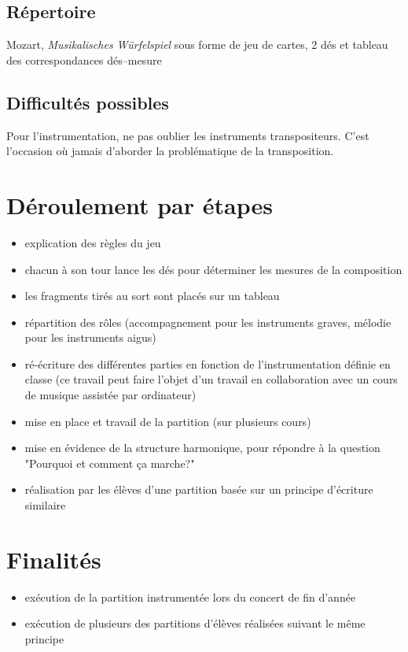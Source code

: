 \documentclass[a4paper,11pt,bibliography=totoc,numbers=noenddot,listof=flat,DIV=11,BCOR=0mm]{scrreprt}%
\begin{document}
\subsection*{Répertoire}
Mozart, \emph{Musikalisches Würfelspiel} sous forme de jeu de cartes, 2 dés et tableau des correspondances dés--mesure

\subsection*{Difficultés possibles}
Pour l'instrumentation, ne pas oublier les instruments transpositeurs. C'est l'occasion où jamais d'aborder la problématique de la transposition.

\section*{Déroulement par étapes}
\begin{itemize}
\item explication des règles du jeu
\item chacun à son tour lance les dés pour déterminer les mesures de la composition
\item les fragments tirés au sort sont placés sur un tableau 
\item répartition des rôles (accompagnement pour les instruments graves, mélodie pour les instruments aigus)
\item ré-écriture des différentes parties en fonction de l'instrumentation définie en classe (ce travail peut faire l'objet d'un travail en collaboration avec un cours de musique assistée par ordinateur)
\item mise en place et travail de la partition (sur plusieurs cours)
\item mise en évidence de la structure harmonique, pour répondre à la question "Pourquoi et comment ça marche?"
\item réalisation par les élèves d’une partition basée sur un principe d’écriture similaire
\end{itemize}

\section*{Finalités}
\begin{itemize}
\item exécution de la partition instrumentée lors du concert de fin d'année
\item exécution de plusieurs des partitions d'élèves réalisées suivant le même principe
\end{itemize}
\end{document}
